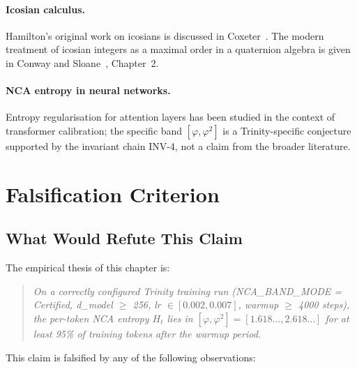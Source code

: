 \paragraph{Icosian calculus.}
Hamilton's original work on icosians is discussed in
Coxeter~\cite{coxeter_regular_polytopes}.  The modern treatment of
icosian integers as a maximal order in a quaternion algebra is given
in Conway and Sloane~\cite{conway_sphere_packings}, Chapter~2.

\paragraph{NCA entropy in neural networks.}
Entropy regularisation for attention layers has been studied in the
context of transformer calibration; the specific band
\([\varphi, \varphi^2]\) is a Trinity-specific conjecture supported
by the invariant chain INV-4, not a claim from the broader literature.

\section{Falsification Criterion}
\label{sec:e8-falsify}


\subsection{What Would Refute This Claim}
\label{subsec:falsify-refutation}

The empirical thesis of this chapter is:

\begin{quote}
\emph{On a correctly configured Trinity training run (NCA\_BAND\_MODE
= Certified, d\_model $\geq$ 256, lr $\in [0.002, 0.007]$, warmup
$\geq$ 4000 steps), the per-token NCA entropy \(H_t\) lies in
\([\varphi, \varphi^2] = [1.618\ldots, 2.618\ldots]\) for at least
95\% of training tokens after the warmup period.}
\end{quote}

This claim is falsified by any of the following observations:

